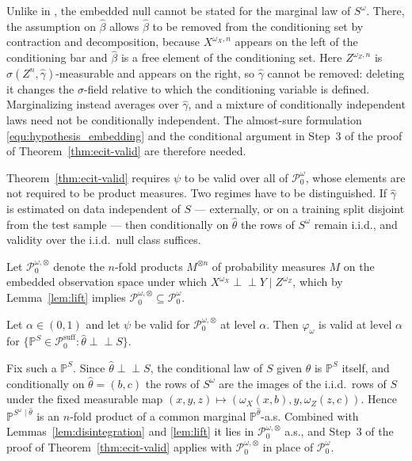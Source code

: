 \documentclass[twoside,11pt]{article}
\newcommand{\indep}{\perp \!\!\! \perp}
\begin{document}
\begin{remark}\label{rem:no-marginal}
Unlike in \citet[Theorem 2]{simnacher2026deep}, the embedded null cannot be stated for the marginal law of
$S^\omega$. There, the assumption on $\hat\beta$ allows $\hat\beta$ to be removed from the conditioning
set by contraction and decomposition, because $X^{\omega_X,n}$ appears on the left of the conditioning
bar and $\hat\beta$ is a free element of the conditioning set. Here $Z^{\omega_Z,n}$ is
$\sigma(Z^n,\hat\gamma)$-measurable and appears on the right, so $\hat\gamma$ cannot be removed: deleting it
changes the $\sigma$-field relative to which the conditioning variable is defined.
Marginalizing instead averages over $\hat\gamma$, and a mixture of conditionally independent laws need not be conditionally independent. The almost-sure formulation
\eqref{equ:hypothesis_embedding} and the conditional argument in Step~3 of the proof of
Theorem~\ref{thm:ecit-valid} are therefore needed.
\end{remark}

Theorem~\ref{thm:ecit-valid} requires $\psi$ to be valid over all of $\mathcal{P}_0^{\omega}$, whose elements are not required to be product measures. Two regimes have to be distinguished. If $\hat\gamma$ is estimated on data independent of $S$ --- externally, or on a training split disjoint from the test sample --- then conditionally on $\hat\theta$ the rows of $S^\omega$ remain i.i.d., and validity over the i.i.d.\ null class suffices.

Let $\mathcal P_0^{\omega,\otimes}$ denote the $n$-fold products $M^{\otimes n}$ of probability measures $M$ on the embedded observation space under which $X^{\omega_X}\indep Y\mid Z^{\omega_Z}$, which by Lemma~\ref{lem:lift} implies $\mathcal P_0^{\omega,\otimes}\subseteq\mathcal P_0^\omega$.

\begin{corollaryE}\label{cor:indep}
Let $\alpha\in(0,1)$ and let $\psi$ be valid for $\mathcal{P}^{\omega,\otimes}_0$ at level $\alpha$. Then $\varphi_\omega$ is valid at level $\alpha$ for $\{\mathbb{P}^S\in\mathcal{P}^{\mathrm{suff}}_0:\hat\theta\indep S\}$.
\end{corollaryE}
\begin{proofE}
Fix such a $\mathbb{P}^S$. Since $\hat\theta\indep S$, the conditional law of $S$ given
$\hat\theta$ is $\mathbb{P}^S$ itself, and conditionally on $\hat\theta=(b,c)$ the rows of
$S^\omega$ are the images of the i.i.d.\ rows of $S$ under the fixed measurable map
$(x,y,z)\mapsto(\omega_X(x,b),y,\omega_Z(z,c))$. Hence $\mathbb{P}^{S^\omega\mid\hat\theta}$ is an
$n$-fold product of a common marginal $\mathbb{P}^{\hat\theta}$-a.s. Combined with Lemmas~\ref{lem:disintegration} and \ref{lem:lift} it lies in $\mathcal{P}^{\omega,\otimes}_0$ a.s., and Step~3 of the proof of
Theorem~\ref{thm:ecit-valid} applies with $\mathcal{P}^{\omega,\otimes}_0$ in place of
$\mathcal{P}^{\omega}_0$.
\end{proofE}
\end{document}
